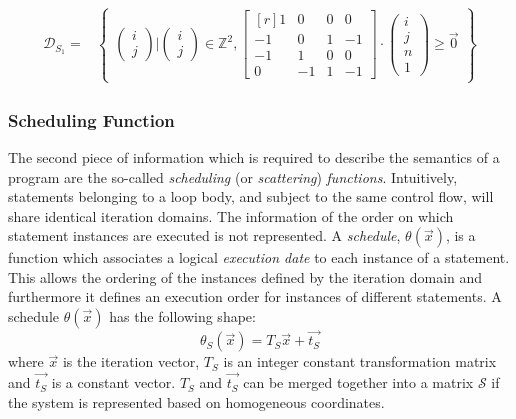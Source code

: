\begin{align*}
\mathcal{D}_{S_1} = & \begin{Bmatrix} 
	\begin{pmatrix} i \\ j \end{pmatrix} \big|
	\begin{pmatrix} i \\ j \end{pmatrix} \in \mathbb{Z}^2,
	\begin{bmatrix*}[r] 1 & 0 & 0 & 0\\ -1 & 0 & 1 & -1 \\ 
			-1 & 1 & 0 & 0 \\  0 & -1 & 1 & -1 
	\end{bmatrix*} \cdot
	\begin{pmatrix} i \\ j \\ n \\ 1 \end{pmatrix}
	\ge \vec{0}
\end{Bmatrix}
\end{align*}

\subsubsection{Scheduling Function}
The second piece of information which is required to describe the semantics of a
program are the so-called \emph{scheduling} (or \emph{scattering})
\emph{functions}. Intuitively, statements belonging to a loop body, and subject
to the same control flow, will share identical iteration domains. The
information of the order on which statement instances are executed is not
represented. A \emph{schedule}, $\theta(\vec{x})$, is a function which
associates a logical \emph{execution date} to each instance of a statement. This
allows the ordering of the instances defined by the iteration domain and
furthermore it defines an execution order for instances of different statements.
A schedule $\theta(\vec{x})$ has the following shape:
\[
\theta_S (\vec{x}) = T_S\vec{x} + \vec{t_S}
\]
where $\vec{x}$ is the iteration vector, $T_S$ is an integer constant
transformation matrix and $\vec{t_S}$ is a constant vector. $T_S$ and
$\vec{t_S}$ can be merged together into a matrix $\mathcal{S}$ if the system is
represented based on homogeneous coordinates. 

